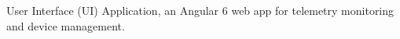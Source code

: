 User Interface (UI) Application, an Angular 6 web app for telemetry monitoring and device management.